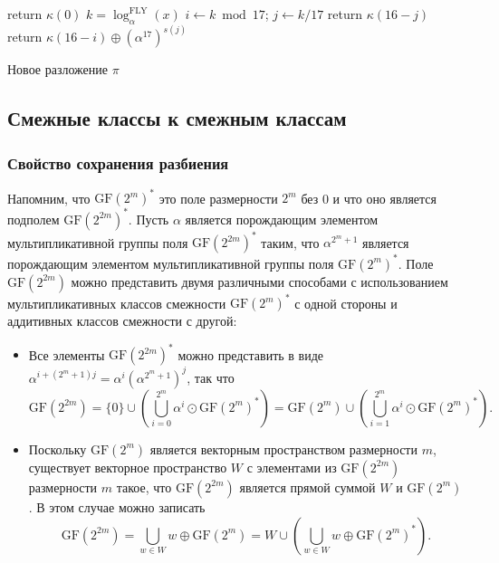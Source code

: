 \begin{algorithm}[htp!]
     {
      return $\kappa(0)$\;
    }{
      $k = \log_{\alpha}^{\text{FLY}}(x)$\;
      $i \gets k \bmod 17$; \quad $j \gets k/17 $ 
       { 
        return $\kappa(16 - j)$ 
      }{
        return $\kappa(16 - i) \oplus (\alpha^{17})^{s(j)}$ 
      }
    }
  \caption{Новое разложение \(\pi\)}
  \label{alg:alg01}
\end{algorithm}

\subsection{Смежные классы к смежным классам}

\subsubsection{Свойство сохранения разбиения}

Напомним, что \(\mathrm{GF}(2^m)^*\) это поле размерности \(2^m\) без 0 и что оно является подполем \(\mathrm{GF}(2^{2m})^*\). Пусть \(\alpha\) является порождающим элементом мультипликативной группы поля \(\mathrm{GF}(2^{2m})^*\) таким, что \(\alpha^{2^m+1}\) является порождающим элементом мультипликативной группы поля \(\mathrm{GF}(2^m)^*\). Поле \(\mathrm{GF}(2^{2m})\) можно представить двумя различными способами с использованием мультипликативных классов смежности \(\mathrm{GF}(2^m)^*\) с одной стороны и аддитивных классов смежности с другой:

\begin{itemize}
  \item Все элементы \(\mathrm{GF}(2^{2m})^*\) можно представить в виде \(\alpha^{i+(2^m+1)j} = \alpha^i (\alpha^{2^m+1})^j\), так что
  \[
  \mathrm{GF}(2^{2m}) = \{0\} \cup \left(\bigcup_{i=0}^{2^m} \alpha^i \odot \mathrm{GF}(2^m)^*\right) = \mathrm{GF}(2^m) \cup \left(\bigcup_{i=1}^{2^m} \alpha^i \odot \mathrm{GF}(2^m)^*\right).
  \]
  \item Поскольку \(\mathrm{GF}(2^m)\) является векторным пространством размерности \(m\), существует векторное пространство \(W\) с элементами из \(\mathrm{GF}(2^{2m})\) размерности \(m\) такое, что \(\mathrm{GF}(2^{2m})\) является прямой суммой \(W\) и \(\mathrm{GF}(2^m)\). В этом случае можно записать
  \[
  \mathrm{GF}(2^{2m}) = \bigcup_{w \in W} w \oplus \mathrm{GF}(2^m) = W \cup \left(\bigcup_{w \in W} w \oplus \mathrm{GF}(2^m)^*\right).
  \]
\end{itemize}

